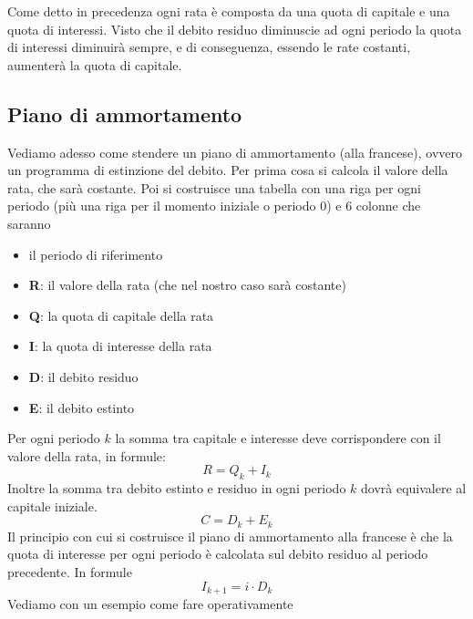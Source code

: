Come detto in precedenza ogni rata è composta da una quota di capitale e una 
quota di interessi. Visto che il debito residuo diminuscie ad ogni periodo la 
quota di interessi diminuirà sempre, e di conseguenza, essendo le rate costanti, 
aumenterà la quota di capitale.

\subsection{Piano di ammortamento} Vediamo adesso come stendere un piano di 
ammortamento (alla francese), ovvero un programma di estinzione del debito. Per 
prima cosa si calcola il valore della rata, che sarà costante. Poi si costruisce 
una tabella con una riga per ogni periodo (più una riga per il momento iniziale 
o periodo $0$) e 6 colonne che saranno \begin{itemize} \item il periodo di 
riferimento \item \textbf{R}: il valore della rata (che nel nostro caso sarà 
costante) \item \textbf{Q}: la quota di capitale della rata \item \textbf{I}: la 
quota di interesse della rata \item \textbf{D}: il debito residuo \item 
\textbf{E}: il debito estinto \end{itemize} Per ogni periodo $k$ la somma tra 
capitale e interesse deve corrispondere con il valore della rata, in formule: 
$$R=Q_k+I_k$$ Inoltre la somma tra debito estinto e residuo in ogni periodo $k$ 
dovrà equivalere al capitale iniziale. $$C=D_k+E_k$$ Il principio con cui si 
costruisce il piano di ammortamento alla francese è che la quota di interesse 
per ogni periodo è calcolata sul debito residuo al periodo precedente. In 
formule $$I_{k+1}=i\cdot D_k$$ Vediamo con un esempio come fare operativamente

